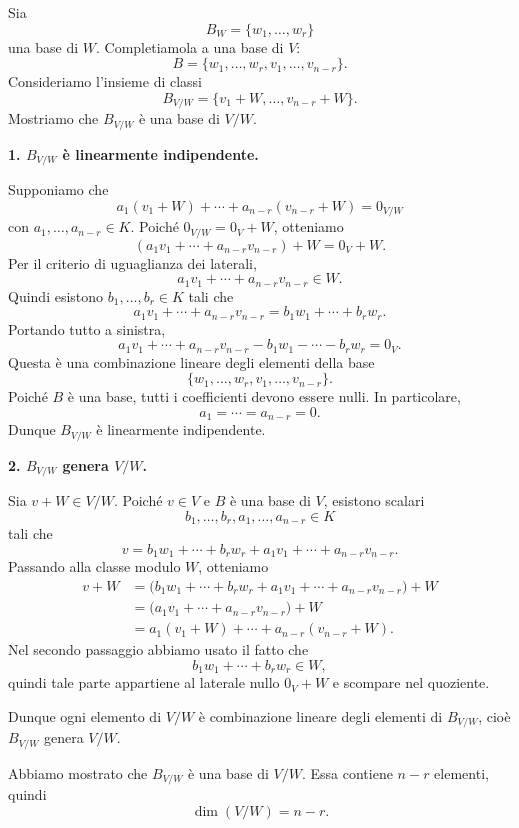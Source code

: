 \documentclass[a4paper]{article}
\begin{document}
\begin{radioactive}
\begin{snippetproof}{}
    Sia
    \[
        B_W=\{w_1,\ldots,w_r\}
    \]
    una base di \(W\). Completiamola a una base di \(V\):
    \[
        B=\{w_1,\ldots,w_r,v_1,\ldots,v_{n-r}\}.
    \]
    Consideriamo l'insieme di classi
    \[
        B_{V/W}
        =
        \{v_1+W,\ldots,v_{n-r}+W\}.
    \]
    Mostriamo che \(B_{V/W}\) è una base di \(V/W\).

    \textbf{1. \(B_{V/W}\) è linearmente indipendente.}

    Supponiamo che
    \[
        a_1(v_1+W)+\cdots+a_{n-r}(v_{n-r}+W)
        =
        0_{V/W}
    \]
    con \(a_1,\ldots,a_{n-r} \in K\). Poiché \(0_{V/W}=0_V+W\), otteniamo
    \[
        (a_1v_1+\cdots+a_{n-r}v_{n-r})+W
        =
        0_V+W.
    \]
    Per il criterio di uguaglianza dei laterali,
    \[
        a_1v_1+\cdots+a_{n-r}v_{n-r} \in W.
    \]
    Quindi esistono \(b_1,\ldots,b_r \in K\) tali che
    \[
        a_1v_1+\cdots+a_{n-r}v_{n-r}
        =
        b_1w_1+\cdots+b_rw_r.
    \]
    Portando tutto a sinistra,
    \[
        a_1v_1+\cdots+a_{n-r}v_{n-r}
        -
        b_1w_1-\cdots-b_rw_r
        =
        0_V.
    \]
    Questa è una combinazione lineare degli elementi della base
    \[
        \{w_1,\ldots,w_r,v_1,\ldots,v_{n-r}\}.
    \]
    Poiché \(B\) è una base, tutti i coefficienti devono essere nulli. In particolare,
    \[
        a_1=\cdots=a_{n-r}=0.
    \]
    Dunque \(B_{V/W}\) è linearmente indipendente.

    \textbf{2. \(B_{V/W}\) genera \(V/W\).}

    Sia \(v+W \in V/W\). Poiché \(v \in V\) e \(B\) è una base di \(V\), esistono scalari
    \[
        b_1,\ldots,b_r,a_1,\ldots,a_{n-r} \in K
    \]
    tali che
    \[
        v
        =
        b_1w_1+\cdots+b_rw_r
        +
        a_1v_1+\cdots+a_{n-r}v_{n-r}.
    \]
    Passando alla classe modulo \(W\), otteniamo
    \begin{align*}
        v+W
        &=
        \big(b_1w_1+\cdots+b_rw_r
        +
        a_1v_1+\cdots+a_{n-r}v_{n-r}\big)+W \\
        &=
        \big(a_1v_1+\cdots+a_{n-r}v_{n-r}\big)+W \\
        &=
        a_1(v_1+W)+\cdots+a_{n-r}(v_{n-r}+W).
    \end{align*}
    Nel secondo passaggio abbiamo usato il fatto che
    \[
        b_1w_1+\cdots+b_rw_r \in W,
    \]
    quindi tale parte appartiene al laterale nullo \(0_V+W\) e scompare nel quoziente.

    Dunque ogni elemento di \(V/W\) è combinazione lineare degli elementi di \(B_{V/W}\), cioè \(B_{V/W}\) genera \(V/W\).

    Abbiamo mostrato che \(B_{V/W}\) è una base di \(V/W\). Essa contiene \(n-r\) elementi, quindi
    \[
        \dim(V/W)=n-r.
    \]
\end{snippetproof}
\end{radioactive}
\end{document}
